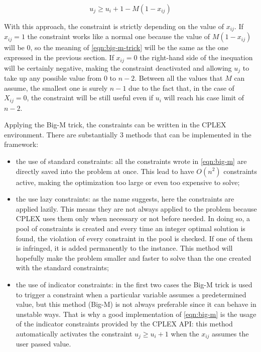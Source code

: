 \begin{equation}
\label{eqn:big-m-trick}
u_j\ge u_i+1-M(1-x_{ij})
\end{equation}

With this approach, the constraint is strictly depending on the value of $x_{ij}$. If $x_{ij}=1$ the constraint works like a normal one because the value of $M(1-x_{ij})$ will be $0$, so the meaning of \ref{eqn:big-m-trick} will be the same as the one expressed in the previous section. 
If $x_{ij}=0$ the right-hand side of the inequation will be certainly negative, making the constraint deactivated and allowing $u_j$ to take up any possible value from $0$ to $n-2$. Between all the values that $M$ can assume, the smallest one is surely $n-1$ due to the fact that, in the case of $X_{ij}=0$, the constraint will be still useful even if $u_i$ will reach his case limit of $n-2$.

Applying the Big-M trick, the constraints can be written in the CPLEX environment. There are substantially 3 methods that can be implemented in the framework:

\begin{itemize}
	\item the use of standard constraints: all the constraints wrote in \ref{eqn:big-m} are directly saved into the problem at once. This lead to have $O(n^2)$ constraints active, making the optimization too large or even too expensive to solve;
	
	\item the use lazy constraints: as the name suggests, here the constraints are applied lazily. This means they are not always applied to the problem because CPLEX uses them only when necessary or not before needed. In doing so, a pool of constraints is created and every time an integer optimal solution is found, the violation of every constraint in the pool is checked.
	If one of them is infringed, it is added permanently to the instance. This method will hopefully make the problem smaller and faster to solve than the one created with the standard constraints;
	
	\item the use of indicator constraints: in the first two cases the Big-M trick is used to trigger a constraint when a particular variable assumes a predetermined value, but this method (Big-M) is not always preferable since it can behave in unstable ways. That is why a good implementation of \ref{eqn:big-m} is the usage of the indicator constraints provided by the CPLEX API: this method automatically activates the constraint $u_j \ge u_i + 1$ when the $x_{ij}$ assumes the user passed value.
\end{itemize}